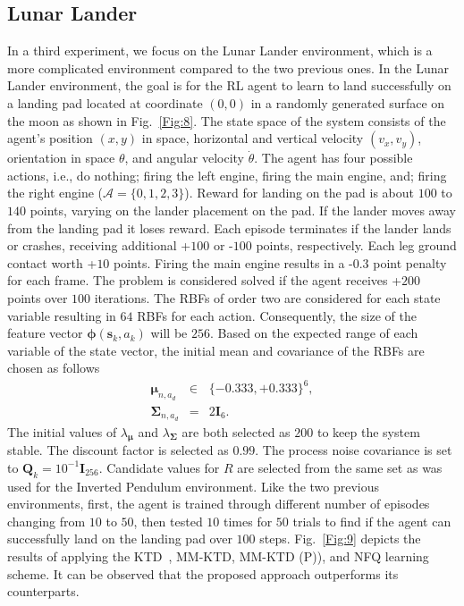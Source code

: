 \documentclass{ieeeaccess}
\def\mA{\mathcal{A}}
\def\MMK{\text{MM-KTD}}
\def\k{_{k}}
\def\I{\bm{I}}
\def\Q{\bm{Q}}
\def\u{\bm{\mu}}
\def\Sig{\bm{\Sigma}}
\def\s{\bm{s}}
\begin{document}
\subsection{Lunar Lander}  \label{sec:lunar_lander}
In a third experiment, we focus on the Lunar Lander environment, which is a more complicated environment compared to the two previous ones. In the  Lunar Lander environment, the goal is for the RL agent to learn to land successfully on a landing pad located at coordinate  $(0,0)$ in a randomly generated surface on the moon as shown in Fig.~\ref{Fig:8}. The state space of the system consists of the agent's position $(x,y)$ in space, horizontal and vertical velocity $(v_x,v_y)$, orientation in space $\theta$, and angular velocity $\dot{\theta}$. The agent has four possible actions, i.e., do nothing; firing the left engine, firing the main engine, and; firing the right engine ($\mA =\{0, 1, 2, 3 \}$).  Reward for landing on the pad is about $100$ to $140$ points, varying on the lander placement on the pad. If the lander moves away from the landing pad it loses reward. Each episode terminates if the lander lands or crashes, receiving additional +$100$ or -$100$ points, respectively. Each leg ground contact worth +$10$ points. Firing the main engine results in a -$0.3$ point penalty for each frame. The problem is considered solved if the agent receives +$200$ points over $100$ iterations. The RBFs of order two are considered for each state variable resulting in $64$ RBFs for each action. Consequently, the size of the feature vector $\bm{\phi}(\s\k,a\k)$ will be $256$. Based on the expected range of each variable of the state vector, the initial mean and covariance of the RBFs are chosen as follows
%
\begin{eqnarray}
\u_{n,a_d} &\in& \{-0.333, +0.333\}^6,
\\
\Sig_{n,a_d}&=& 2\I_{6}.
\end{eqnarray}
%
The initial values of $\lambda_{\u}$ and $\lambda_{\Sig}$ are both selected as $200$ to keep the system stable. The discount factor is selected as $0.99$. The process noise covariance is set to $\Q\k=10^{-1}\I_{256}$. Candidate values for $R$ are selected from the same set as was used for the Inverted Pendulum environment. Like the two previous environments, first, the agent is trained through different number of episodes changing from $10$ to $50$, then tested $10$ times for $50$ trials to find if the agent can successfully land on the landing pad over $100$ steps. Fig.~\ref{Fig:9} depicts the results of applying the KTD~\cite{23}, $\MMK$, $\MMK$ (P)), and NFQ learning~\cite{6} scheme. It can be observed that the proposed approach outperforms its counterparts.
\end{document}

